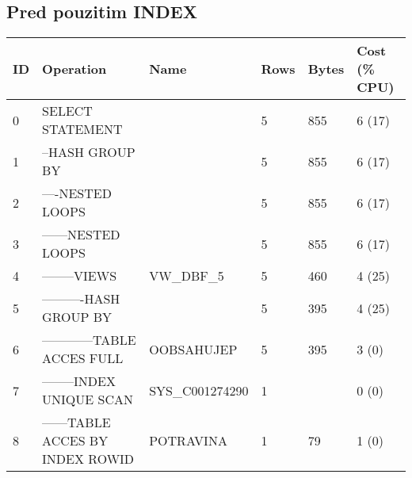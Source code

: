 \documentclass[11pt, a4paper]{article}[]
\begin{document}
    \subsection {Pred pouzitim INDEX}
        \begin{table}[]
	\centering
	\begin{tabular}{|l|l|l|l|l|l|}
        \hline
        ID & Operation                        & Name            & Rows & Bytes & Cost (\% CPU) \\ \hline
        0  & SELECT STATEMENT                 &                 & 5    & 855   & 6 (17)        \\
        1  & --HASH GROUP BY                  &                 & 5    & 855   & 6 (17)        \\
        2  & ----NESTED LOOPS                 &                 & 5    & 855   & 6 (17)        \\
        3  & ------NESTED LOOPS               &                 & 5    & 855   & 6 (17)        \\
        4  & --------VIEWS                    & VW\_DBF\_5      & 5    & 460   & 4 (25)        \\
        5  & ----------HASH GROUP BY          &                 & 5    & 395   & 4 (25)        \\
        6  & ------------TABLE ACCES FULL     & OOBSAHUJEP      & 5    & 395   & 3 (0)         \\
        7  & --------INDEX UNIQUE SCAN        & SYS\_C001274290 & 1    &       & 0 (0)         \\
        8  & ------TABLE ACCES BY INDEX ROWID & POTRAVINA       & 1    & 79    & 1 (0)         \\ \hline
        \end{tabular}
        \end{table}
\end{document}
